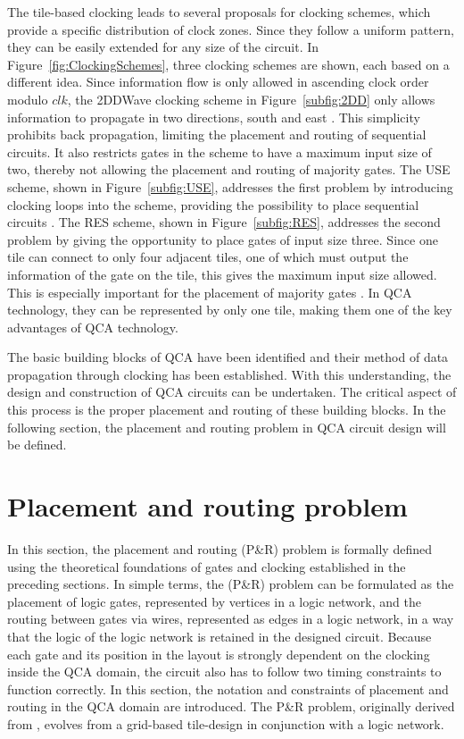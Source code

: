 The tile-based clocking leads to several proposals for clocking schemes, which provide a specific distribution of clock zones. Since they follow a uniform pattern, they can be easily extended for any size of the circuit. In Figure~\ref{fig:ClockingSchemes}, three clocking schemes are shown, each based on a different idea. Since information flow is only allowed in ascending clock order modulo $clk$, the 2DDWave clocking scheme in Figure~\ref{subfig:2DD} only allows information to propagate in two directions, south and east \cite{2DD}. This simplicity prohibits back propagation, limiting the placement and routing of sequential circuits. It also restricts gates in the scheme to have a maximum input size of two, thereby not allowing the placement and routing of majority gates. The USE scheme, shown in Figure~\ref{subfig:USE}, addresses the first problem by introducing clocking loops into the scheme, providing the possibility to place sequential circuits \cite{USE}. The RES scheme, shown in Figure~\ref{subfig:RES}, addresses the second problem by giving the opportunity to place gates of input size three. Since one tile can connect to only four adjacent tiles, one of which must output the information of the gate on the tile, this gives the maximum input size allowed. This is especially important for the placement of majority gates \cite{RES}. In QCA technology, they can be represented by only one tile, making them one of the key advantages of QCA technology.

The basic building blocks of QCA have been identified and their method of data propagation through clocking has been established. With this understanding, the design and construction of QCA circuits can be undertaken. The critical aspect of this process is the proper placement and routing of these building blocks. In the following section, the placement and routing problem in QCA circuit design will be defined.

\section{Placement and routing problem} \label{sec:PR}

In this section, the placement and routing (P\&R) problem is formally defined using the theoretical foundations of gates and clocking established in the preceding sections. In simple terms, the (P\&R) problem can be formulated as the placement of logic gates, represented by vertices in a logic network, and the routing between gates via wires, represented as edges in a logic network, in a way that the logic of the logic network is retained in the designed circuit. Because each gate and its position in the layout is strongly dependent on the clocking inside the QCA domain, the circuit also has to follow two timing constraints to function correctly. In this section, the notation and constraints of placement and routing in the QCA domain are introduced. The P\&R problem, originally derived from \cite{Walter}, evolves from a grid-based tile-design in conjunction with a logic network.

